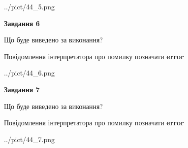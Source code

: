 \documentclass[10pt, ukrainian]{article}
\begin{document}
{\begin {large}
\begin{center}
	{../pict/44_5.png}
\end{center}
\newpage

{\begin {center}\textbf{Завдання 6}\end {center}}\par
Що буде виведено за виконання? \par
Повідомлення інтерпретатора про помилку позначати \textbf{error}

\begin{center}
	{../pict/44_6.png}
\end{center}
\newpage

{\begin {center}\textbf{Завдання 7}\end {center}}\par
Що буде виведено за виконання? \par
Повідомлення інтерпретатора про помилку позначати \textbf{error}

\begin{center}
	{../pict/44_7.png}
\end{center}
\newpage

\end {large}}
\end{document}
